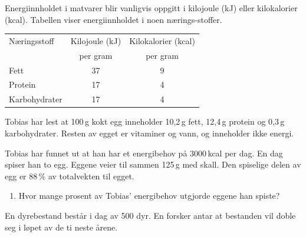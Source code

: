 \newpage
{}	
	Energiinnholdet i matvarer blir vanligvis oppgitt i kilojoule (kJ) eller
	kilokalorier (kcal). Tabellen viser energiinnholdet i noen nærings-stoffer.
	
	\begin{center}
		\begin{tabular}{l c c }
			\hline
			Næringsstoff & Kilojoule (kJ) & Kilokalorier (kcal) \\
						& per gram  & per gram \\
			\hline
			Fett          & 37 & 9 \\
			Protein       & 17 & 4 \\
			Karbohydrater & 17 & 4 \\
			\hline
		\end{tabular}
	\end{center}
	
	Tobias har lest at 100\,g kokt egg inneholder 10,2\,g fett, 12,4\,g protein
	og 0,3\,g karbohydrater. Resten av egget er vitaminer og vann, og inneholder
	ikke energi.
	
	
	Tobias har funnet ut at han har et energibehov på 3000\,kcal per dag.
	En dag spiser han to egg. Eggene veier til sammen 125\,g med skall.
	Den spiselige delen av egg er 88\,\% av totalvekten til egget.
	
	\begin{enumerate}
		\item[b)] Hvor mange prosent av Tobias' energibehov utgjorde eggene han spiste?
	\end{enumerate}

En dyrebestand består i dag av 500 dyr. En forsker antar at bestanden vil
doble seg i løpet av de ti neste årene.






